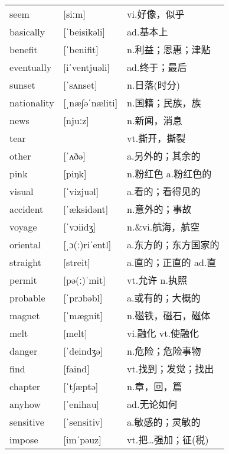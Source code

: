 \documentclass[a4paper]{article}
\begin{document}
\section{}
\begin{tabular}{l l l}

seem & [siːm] & vi.好像，似乎 \\
basically & [ˈbeisikəli] & ad.基本上 \\
benefit & [ˈbenifit] & n.利益；恩惠；津贴 \\
eventually & [iˈventjuəli] & ad.终于；最后 \\
sunset & [ˈsʌnset] & n.日落(时分) \\
nationality & [ˌnæ∫əˈnæliti] & n.国籍；民族，族 \\
news & [njuːz] & n.新闻，消息 \\
tear &  & vt.撕开，撕裂 \\
other & [ˈʌðə] & a.另外的；其余的 \\
pink & [piŋk] & n.粉红色 a.粉红色的 \\
visual & [ˈvizjuəl] & a.看的；看得见的 \\
accident & [ˈæksidənt] & n.意外的；事故 \\
voyage & [ˈvɔiidʒ] & n.\&vi.航海，航空 \\
oriental & [ˌɔ(ː)riˈentl] & a.东方的；东方国家的 \\
straight & [streit] & a.直的；正直的 ad.直 \\
permit & [pə(ː)ˈmit] & vt.允许 n.执照 \\
probable & [ˈprɔbəbl] & a.或有的；大概的 \\
magnet & [ˈmægnit] & n.磁铁，磁石，磁体 \\
melt & [melt] & vi.融化 vt.使融化 \\
danger & [ˈdeindʒə] & n.危险；危险事物 \\
find & [faind] & vt.找到；发觉；找出 \\
chapter & [ˈt∫æptə] & n.章，回，篇 \\
anyhow & [ˈenihau] & ad.无论如何 \\
sensitive & [ˈsensitiv] & a.敏感的；灵敏的 \\
impose & [imˈpəuz] & vt.把…强加；征(税) \\

\end{tabular}
\end{document}
